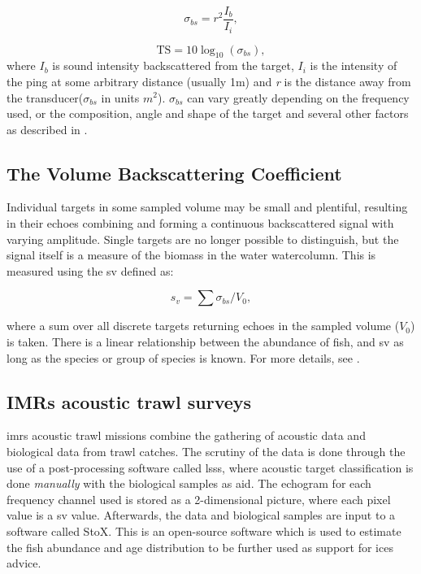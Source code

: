     \begin{equation}
        \sigma_{bs} = r^{2}\frac{I_{b}}{I_{i}},
    \end{equation}
    

    \begin{equation}
        \textrm{TS} = 10 \log_{10}(\sigma_{bs}),
    \end{equation}
    where $I_{b}$ is sound intensity backscattered from the target, $I_{i}$ is the intensity of the ping at some arbitrary distance (usually 1m) and \textit{r} is the distance away from the transducer($\sigma_{bs}$ in units $m^{2}$). $\sigma_{bs}$ can vary greatly depending on the frequency used, or the composition, angle and shape of the target and several other factors as described in \citet{simmonds2008fisheries}. 

\subsection{The Volume Backscattering Coefficient}
    Individual targets in some sampled volume may be small and plentiful, resulting in their echoes combining and forming a continuous backscattered signal with varying amplitude. Single targets are no longer possible to distinguish, but the signal itself is a measure of the biomass in the water watercolumn. This is measured using the \gls{sv} defined as:
    
    \begin{equation}
        s_{v} = \sum \sigma_{bs} / V_{0},
    \end{equation}
    
    where a sum over all discrete targets returning echoes in the sampled volume ($V_{0}$) is taken. There is a linear relationship between the abundance of fish, and \gls{sv} as long as the species or group of species is known. For more details, see \citet{simmonds2008fisheries}.

\subsection{IMRs acoustic trawl surveys}
    \gls{imr}s acoustic trawl missions combine the gathering of acoustic data and biological data from trawl catches. The scrutiny of the data is done through the use of a post-processing software called \gls{lsss}, where acoustic target classification is done \textit{manually} with the biological samples as aid\cite{korneliussen2006large}. The echogram for each frequency channel used is stored as a 2-dimensional picture, where each pixel value is a \gls{sv} value.  Afterwards, the data and biological samples are input to a software called StoX.  This is an open-source software which is used to estimate the fish abundance and age distribution to be further used as support for \gls{ices} advice\cite{johnsen2019stox}. \cite{korneliussen2018acoustic}




